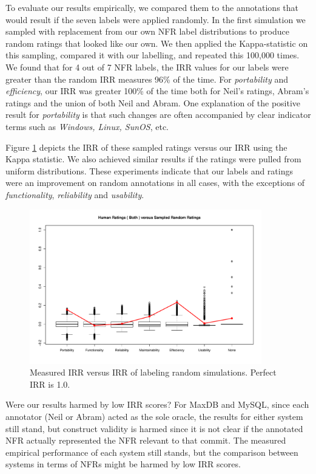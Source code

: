 \documentclass[smallextended]{svjour3}       %
\begin{document}
To evaluate our results empirically, we compared them to the annotations that would result if the seven labels
 were applied randomly. In the first simulation
we sampled with replacement from our own NFR label distributions to
produce random ratings that looked like our own. We then applied the
Kappa-statistic on this sampling, compared it with our labelling, and repeated
this 100,000 times. We found that
for 4 out of 7 NFR labels, the IRR values for our labels were greater than the random
IRR measures 96\% of the time. For \emph{portability} and \emph{efficiency}, our IRR
was greater 100\% of the time both for Neil's ratings, Abram's ratings
and the union of both Neil and Abram. One explanation of the positive result for \emph{portability} is that such changes are often 
accompanied by clear indicator terms such as \emph{Windows, Linux, SunOS}, etc. 

Figure \ref{fig:irr} depicts the IRR of
these sampled ratings versus our IRR using the Kappa statistic. We also achieved similar results if the ratings were pulled from
uniform distributions. These experiments indicate that our labels and
ratings were an improvement on random annotations in all cases, with the exceptions of \emph{functionality},
\emph{reliability} and \emph{usability}. 

\begin{figure}
  \centering
  \includegraphics[width=0.9\textwidth]{figures/self-sample-Both}
  \caption{Measured IRR versus IRR of labeling random simulations. Perfect IRR is 1.0. }
  \label{fig:irr}
\end{figure}

Were our results harmed by low IRR scores? For MaxDB and MySQL, since
each annotator (Neil or Abram) acted as the sole oracle, the results
for either system still stand, but construct validity is harmed since 
it is not clear if the annotated NFR actually represented the NFR relevant to that commit.
 The measured empirical performance of each system still
stands, but the comparison between systems in terms of NFRs might be
harmed by low IRR scores.
\end{document}
